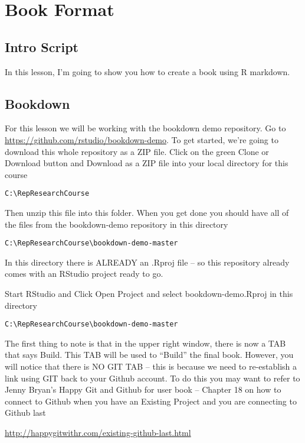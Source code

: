 \documentclass[]{book}
\theoremstyle{definition}
\theoremstyle{definition}
\theoremstyle{definition}
\theoremstyle{remark}
\begin{document}
\chapter{Book Format}\label{books}

\section{Intro Script}\label{intro-script-1}

In this lesson, I'm going to show you how to create a book using R
markdown.

\section{Bookdown}\label{bookdown}

For this lesson we will be working with the bookdown demo repository. Go
to \url{https://github.com/rstudio/bookdown-demo}. To get started, we're
going to download this whole repository as a ZIP file. Click on the
green Clone or Download button and Download as a ZIP file into your
local directory for this course

\texttt{C:\textbackslash{}RepResearchCourse}

Then unzip this file into this folder. When you get done you should have
all of the files from the bookdown-demo repository in this directory

\texttt{C:\textbackslash{}RepResearchCourse\textbackslash{}bookdown-demo-master}

In this directory there is ALREADY an .Rproj file -- so this repository
already comes with an RStudio project ready to go.

Start RStudio and Click Open Project and select bookdown-demo.Rproj in
this directory

\texttt{C:\textbackslash{}RepResearchCourse\textbackslash{}bookdown-demo-master}

The first thing to note is that in the upper right window, there is now
a TAB that says Build. This TAB will be used to ``Build'' the final
book. However, you will notice that there is NO GIT TAB -- this is
because we need to re-establish a link using GIT back to your Github
account. To do this you may want to refer to Jenny Bryan's Happy Git and
Github for user book -- Chapter 18 on how to connect to Github when you
have an Existing Project and you are connecting to Github last

\url{http://happygitwithr.com/existing-github-last.html}
\end{document}
